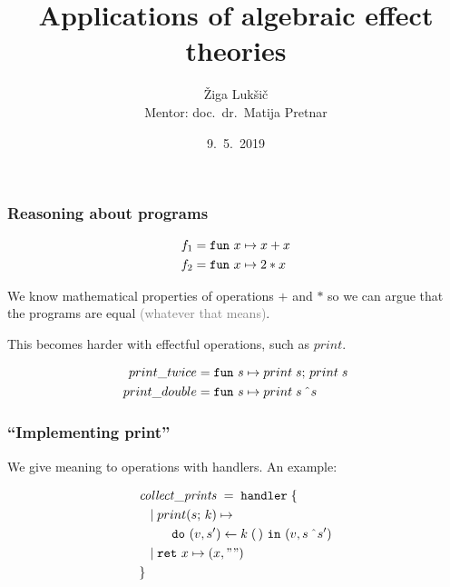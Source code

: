 \documentclass[usenames,dvipsnames]{beamer}
\title[Applications of algebraic effect theories]{\LARGE Applications of algebraic effect theories}
\author[Žiga Lukšič]{Žiga Lukšič \\ Mentor: doc.\ dr.\ Matija Pretnar}
\date{9.\ 5.\ 2019}
\begin{document}
\begin{frame}
  \titlepage
\end{frame}
\begin{frame}
	\frametitle{Reasoning about programs}
	
  \begin{align*}
		f_1 =& \;\mathtt{fun}~{x} \mapsto{x + x}\\
		f_2 =& \;\mathtt{fun}~{x} \mapsto{2*x}
	\end{align*}

	We know mathematical properties of operations $+$ and $*$ so we can argue that the programs are equal \textcolor{gray}{(whatever that means)}.
	
	\vspace{5mm}

	This becomes harder with effectful operations, such as $print$.

	\begin{align*}
		print\_twice =& \;\mathtt{fun}~{s} \mapsto{{print}\;{s};\,{print}\;{s}}\\
		print\_double =& \;\mathtt{fun}~{s} \mapsto{{print}\;{s \, \;\hat{}\;s}}
	\end{align*}


\end{frame}
\begin{frame}
	\frametitle{``Implementing print''}
	
	We give meaning to operations with handlers. An example:

	\begin{align*}
		&\mathit{collect\_prints} \; = \; \keyhandler \; \{ \\
		&\tab | \; \operation[print]{s}{k} \mapsto \\
		&\tab \tab \tab \betterdobind{(v, s')}{\apply{k}{\unit}}(v, s\,\concat s')\\
		&\tab | \; \return{x} \mapsto (x, "") \\
		&\}
	\end{align*}

\end{frame}
\end{document}
